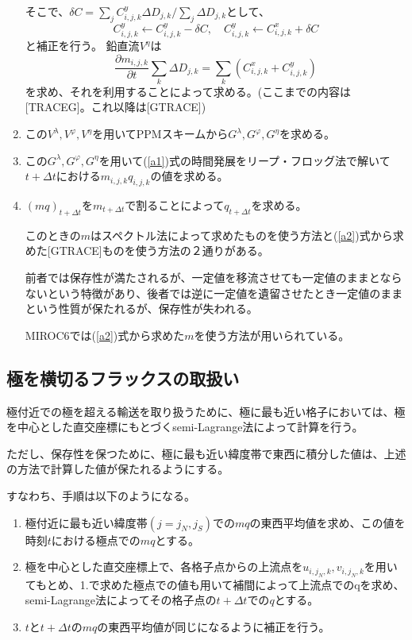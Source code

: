 \documentclass{jsbook}
\begin{document}
\begin{enumerate}
  そこで、$\delta C=\sum_{j}C^{y}_{i,j,k}\Delta D_{j,k}/\sum_{j}\Delta D_{j,k}$として、
  \begin{equation}
    C^{y}_{i,j,k}\leftarrow C^{y}_{i,j,k}-\delta C, \quad C^{y}_{i,j,k}\leftarrow C^{x}_{i,j,k}+\delta C
  \end{equation}
  と補正を行う。
  鉛直流$V^{\eta}$は
  \begin{equation}
    \label{a2}
    \frac{\partial m_{i,j,k}}{\partial t}\sum_{k}\Delta D_{j,k}=\sum_{k}(C^{x}_{i,j,k}+C^{y}_{i,j,k})
  \end{equation}
  を求め、それを利用することによって求める。(ここまでの内容は[TRACEG]。これ以降は[GTRACE])
\item この$V^{\lambda}, V^{\varphi}, V^{\eta}$を用いてPPMスキームから$G^{\lambda}, G^{\varphi}, G^{\eta}$を求める。
\item この$G^{\lambda}, G^{\varphi}, G^{\eta}$を用いて(\ref{a1})式の時間発展をリープ・フロッグ法で解いて$t+\Delta t$における$m_{i,j,k}q_{i,j,k}$の値を求める。
\item $(mq)_{t+\Delta t}$を$m_{t+\Delta t}$で割ることによって$q_{t+\Delta t}$を求める。

  このときの$m$はスペクトル法によって求めたものを使う方法と(\ref{a2})式から求めた[GTRACE]ものを使う方法の２通りがある。

  前者では保存性が満たされるが、一定値を移流させても一定値のままとならないという特徴があり、後者では逆に一定値を遺留させたとき一定値のままという性質が保たれるが、保存性が失われる。

  MIROC6では(\ref{a2})式から求めた$m$を使う方法が用いられている。
\end{enumerate}
\subsection{極を横切るフラックスの取扱い}
極付近での極を超える輸送を取り扱うために、極に最も近い格子においては、極を中心とした直交座標にもとづくsemi-Lagrange法によって計算を行う。

ただし、保存性を保つために、極に最も近い緯度帯で東西に積分した値は、上述の方法で計算した値が保たれるようにする。

すなわち、手順は以下のようになる。

\begin{enumerate}
\item 極付近に最も近い緯度帯$(j=j_{N},j_{S})$での$mq$の東西平均値を求め、この値を時刻$t$における極点での$mq$とする。
\item 極を中心とした直交座標上で、各格子点からの上流点を$u_{i,j_{N},k},v_{i,j_{N},k}$を用いてもとめ、1.で求めた極点での値も用いて補間によって上流点でのqを求め、semi-Lagrange法によってその格子点の$t+\Delta t$での$q$とする。
\item $t$と$t+\Delta t$の$mq$の東西平均値が同じになるように補正を行う。
\end{enumerate}
\end{document}
